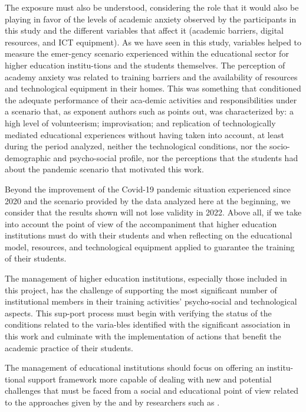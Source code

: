 \documentclass[english]{textolivre}
\begin{document}
The exposure must also be understood, considering the role that it would also be playing in favor of the levels of academic anxiety observed by the participants in this study and the different variables that affect it (academic barriers, digital resources, and ICT equipment). As we have seen in this study, variables helped to measure the emer-gency scenario experienced within the educational sector for higher education institu-tions and the students themselves. The perception of academy anxiety was related to training barriers and the availability of resources and technological equipment in their homes. This was something that conditioned the adequate performance of their aca-demic activities and responsibilities under a scenario that, as exponent authors such as \textcite{pardo_expandir_2021} points out, was characterized by: a high level of volunteerism; improvisation; and replication of technologically mediated educational experiences without having taken into account, at least during the period analyzed, neither the technological conditions, nor the socio-demographic and psycho-social profile, nor the perceptions that the students had about the pandemic scenario that motivated this work.

Beyond the improvement of the Covid-19 pandemic situation experienced since 2020 and the scenario provided by the data analyzed here at the beginning, we consider that the results shown will not lose validity in 2022. Above all, if we take into account the point of view of the accompaniment that higher education institutions must do with their students and when reflecting on the educational model, resources, and technological equipment applied to guarantee the training of their students.

The management of higher education institutions, especially those included in this project, has the challenge of supporting the most significant number of institutional members in their training activities' psycho-social and technological aspects. This sup-port process must begin with verifying the status of the conditions related to the varia-bles identified with the significant association in this work and culminate with the implementation of actions that benefit the academic practice of their students.

The management of educational institutions should focus on offering an institu-tional support framework more capable of dealing with new and potential challenges that must be faced from a social and educational point of view related to the approaches given by the \textcite{european_commission_recomendacion_2018} and by researchers such as \textcite{villafuerte_rol_2020}.
\end{document}
